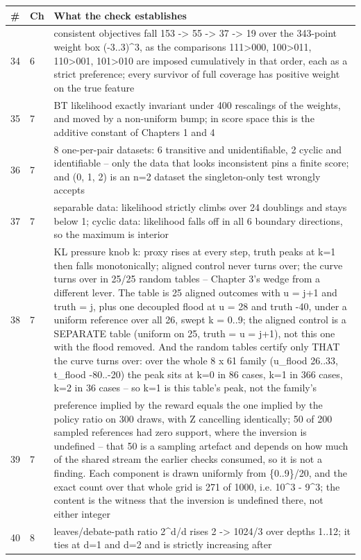 \par\medskip
\noindent
\begin{tabularx}{\textwidth}{llX}
\toprule
\# & Ch & What the check establishes \\
\midrule
34 & 6 & consistent objectives fall 153 -> 55 -> 37 -> 19 over the 343-point weight box (-3..3)\textasciicircum{}3, as the comparisons 111>000, 100>011, 110>001, 101>010 are imposed cumulatively in that order, each as a strict preference; every survivor of full coverage has positive weight on the true feature \\
35 & 7 & BT likelihood exactly invariant under 400 rescalings of the weights, and moved by a non-uniform bump; in score space this is the additive constant of Chapters 1 and 4 \\
36 & 7 & 8 one-per-pair datasets: 6 transitive and unidentifiable, 2 cyclic and identifiable -- only the data that looks inconsistent pins a finite score; and (0, 1, 2) is an n=2 dataset the singleton-only test wrongly accepts \\
37 & 7 & separable data: likelihood strictly climbs over 24 doublings and stays below 1; cyclic data: likelihood falls off in all 6 boundary directions, so the maximum is interior \\
38 & 7 & KL pressure knob k: proxy rises at every step, truth peaks at k=1 then falls monotonically; aligned control never turns over; the curve turns over in 25/25 random tables -- Chapter 3's wedge from a different lever. The table is 25 aligned outcomes with u = j+1 and truth = j, plus one decoupled flood at u = 28 and truth -40, under a uniform reference over all 26, swept k = 0..9; the aligned control is a SEPARATE table (uniform on 25, truth = u = j+1), not this one with the flood removed. And the random tables certify only THAT the curve turns over: over the whole 8 x 61 family (u\_flood 26..33, t\_flood -80..-20) the peak sits at k=0 in 86 cases, k=1 in 366 cases, k=2 in 36 cases -- so k=1 is this table's peak, not the family's \\
39 & 7 & preference implied by the reward equals the one implied by the policy ratio on 300 draws, with Z cancelling identically; 50 of 200 sampled references had zero support, where the inversion is undefined -- that 50 is a sampling artefact and depends on how much of the shared stream the earlier checks consumed, so it is not a finding. Each component is drawn uniformly from \{0..9\}/20, and the exact count over that whole grid is 271 of 1000, i.e. 10\textasciicircum{}3 - 9\textasciicircum{}3; the content is the witness that the inversion is undefined there, not either integer \\
40 & 8 & leaves/debate-path ratio 2\textasciicircum{}d/d rises 2 -> 1024/3 over depths 1..12; it ties at d=1 and d=2 and is strictly increasing after \\
\bottomrule
\end{tabularx}

